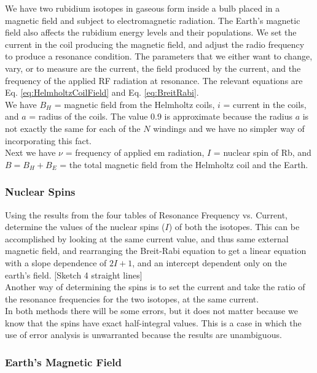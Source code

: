 \documentclass{../lab}
\begin{document}
We have two rubidium isotopes in gaseous form inside a bulb placed in a magnetic field and subject to electromagnetic radiation. The Earth's magnetic field also affects the rubidium energy levels and their populations. We set the current in the coil producing the magnetic field, and adjust the radio frequency to produce a resonance condition. The parameters that we either want to change, vary, or to measure are the current, the field produced by the current, and the frequency of the applied RF radiation at resonance. The relevant equations are Eq. \ref{eq:HelmholtzCoilField} and Eq. \ref{eq:BreitRabi}. \\

We have $B_H$ = magnetic field from the Helmholtz coils, $i$ = current in the coils, and $a$ = radius of the coils. The value 0.9 is approximate because the radius $a$ is not exactly the same for each of the $N$ windings and we have no simpler way of incorporating this fact. \\

Next we have $\nu$ = frequency of applied em radiation, $I$ = nuclear spin of Rb, and $B = B_H + B_E$ = the total magnetic field from the Helmholtz coil and the Earth.

\subsubsection{Nuclear Spins}

Using the results from the four tables of Resonance Frequency vs. Current, determine the values of the nuclear spins ($I$) of both the isotopes. This can be accomplished by looking at the same current value, and thus same external magnetic field, and rearranging the Breit-Rabi equation to get a linear equation with a slope dependence of $2I + 1$, and an intercept dependent only on the earth's field. [Sketch 4 straight lines] \\

Another way of determining the spins is to set the current and take the ratio of the resonance frequencies for the two isotopes, at the same current. \\

In both methods there will be some errors, but it does not matter because we know that the spins have exact half-integral values. This is a case in which the use of error analysis is unwarranted because the results are unambiguous.

\subsubsection{Earth's Magnetic Field}
\end{document}
